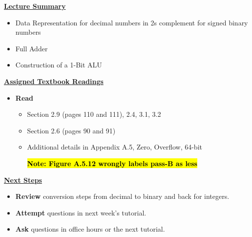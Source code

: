 


% 

\begin{frame}[fragile]
 \underline{\textbf{Lecture Summary}}
 \begin{itemize}
 \item Data Representation for decimal numbers in 2s complement for signed binary numbers
 \item Full Adder
 \item Construction of a 1-Bit ALU
 \end{itemize}
 \underline{\textbf{Assigned Textbook Readings}}
\begin{itemize}
     \item \textbf{Read} 
     \begin{itemize}
     \item Section 2.9 (pages 110 and 111), 2.4, 3.1, 3.2
         \item Section 2.6 (pages 90 and 91)
         \item Additional details in Appendix A.5, Zero, Overflow, 64-bit

\hl{\textbf{Note: Figure A.5.12 wrongly labels pass-B as less}}
     \end{itemize}
     \end{itemize}
    \underline{\textbf{Next Steps}}
    \begin{itemize}
     \item \textbf{Review} conversion steps from decimal to binary and back for integers. 
\item \textbf{Attempt} questions in next week's tutorial. 
    \item \textbf{Ask} questions in office hours or the next tutorial.
 \end{itemize}

\end{frame}

